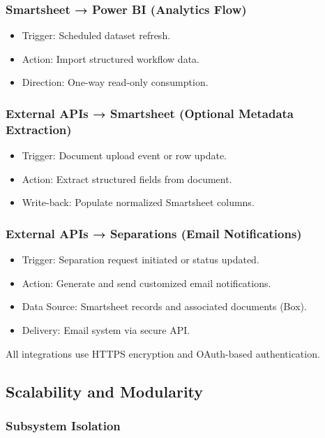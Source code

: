 \documentclass[12pt]{article}
\begin{document}
\subsubsection{Smartsheet → Power BI (Analytics Flow)}

\begin{itemize}
    \item Trigger: Scheduled dataset refresh.
    \item Action: Import structured workflow data.
    \item Direction: One-way read-only consumption.
\end{itemize}

\subsubsection{External APIs → Smartsheet (Optional Metadata Extraction)}

\begin{itemize}
    \item Trigger: Document upload event or row update.
    \item Action: Extract structured fields from document.
    \item Write-back: Populate normalized Smartsheet columns.
\end{itemize}

\subsubsection{External APIs → Separations (Email Notifications)}
\begin{itemize}
    \item Trigger: Separation request initiated or status updated.
    \item Action: Generate and send customized email notifications.
    \item Data Source: Smartsheet records and associated documents (Box).
    \item Delivery: Email system via secure API.
\end{itemize}

All integrations use HTTPS encryption and OAuth-based authentication.

\subsection{Scalability and Modularity}

\subsubsection{Subsystem Isolation}
\end{document}
